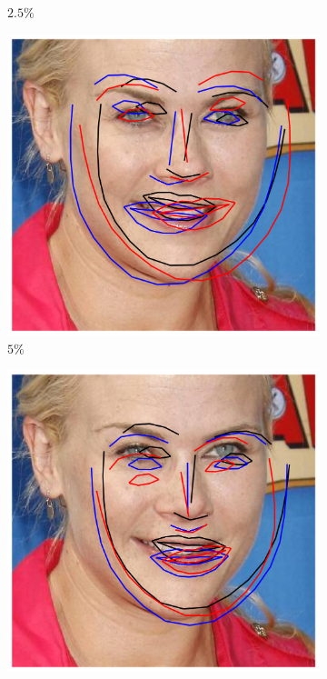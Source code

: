 \begin{figure}[t!]
\begin{subfigure}{0.16\textwidth}
		\caption{$2.5\%$}
		\label{fig:ini_1}
	\end{subfigure}
	\begin{subfigure}{0.16\textwidth}
		\includegraphics[width=\textwidth]{figures/ini_2.png}
		\caption{$5\%$}
		\label{fig:ini_2}
	\end{subfigure}
	\begin{subfigure}{0.16\textwidth}
		\includegraphics[width=\textwidth]{figures/ini_3.png}

\end{subfigure}
\end{figure}
